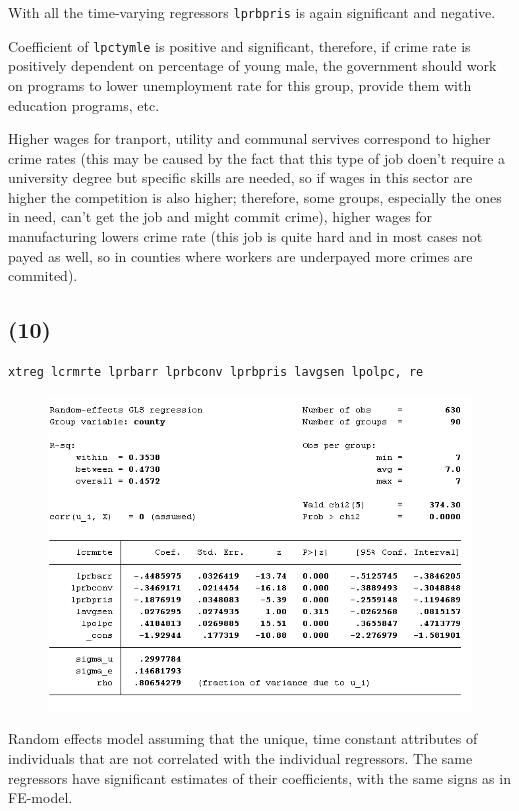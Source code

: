 \documentclass[12pt,a4paper, oneside]{extreport}
\begin{document}
With all the time-varying regressors \texttt{lprbpris} is again significant and negative.

Coefficient of \texttt{lpctymle} is positive and significant, therefore, if crime rate is positively dependent on percentage of young male, the government should  work on programs to lower unemployment rate for this group, provide them with education programs, etc. 

Higher wages for tranport, utility and communal servives correspond to higher   crime rates (this may be caused by the fact that this type of job doen't require a university degree but  specific skills are needed, so if wages in this sector are higher the competition is also higher; therefore, some groups, especially the ones in need,  can't get the job and might commit crime), higher wages for manufacturing lowers crime rate (this job is quite hard and in most cases not payed as well, so in counties where workers are underpayed more crimes are commited).

\newpage 

\subsection*{(10)}

\begin{verbatim}
xtreg lcrmrte lprbarr lprbconv lprbpris lavgsen lpolpc, re
\end{verbatim}


\begin{figure}[H]
	\centering
	\includegraphics[width=0.7\linewidth]{screenshot033}
	\label{fig:screenshot001}
\end{figure}



Random effects model assuming that the unique, time constant attributes of individuals that are not correlated with the individual regressors. The same regressors have significant estimates of their coefficients, with the same signs as in FE-model.  
\end{document}
